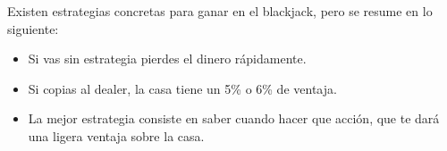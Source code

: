 Existen estrategias concretas para ganar en el blackjack, pero se resume en lo siguiente:
\begin{itemize}
    \item Si vas sin estrategia pierdes el dinero rápidamente.
    \item Si copias al dealer, la casa tiene un 5\% o 6\% de ventaja.
    \item La mejor estrategia consiste en saber cuando hacer que acción, que te dará una ligera ventaja sobre la casa.
\end{itemize}





